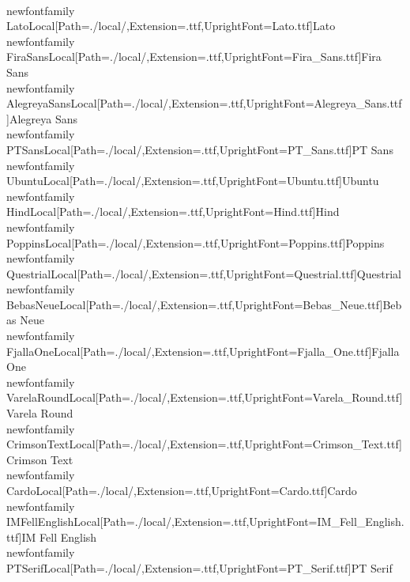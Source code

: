 \\newfontfamily\\LatoLocal[Path=./local/,Extension=.ttf,UprightFont={Lato.ttf}]{Lato}
\\newfontfamily\\FiraSansLocal[Path=./local/,Extension=.ttf,UprightFont={Fira_Sans.ttf}]{Fira Sans}
\\newfontfamily\\AlegreyaSansLocal[Path=./local/,Extension=.ttf,UprightFont={Alegreya_Sans.ttf}]{Alegreya Sans}
\\newfontfamily\\PTSansLocal[Path=./local/,Extension=.ttf,UprightFont={PT_Sans.ttf}]{PT Sans}
\\newfontfamily\\UbuntuLocal[Path=./local/,Extension=.ttf,UprightFont={Ubuntu.ttf}]{Ubuntu}
\\newfontfamily\\HindLocal[Path=./local/,Extension=.ttf,UprightFont={Hind.ttf}]{Hind}
\\newfontfamily\\PoppinsLocal[Path=./local/,Extension=.ttf,UprightFont={Poppins.ttf}]{Poppins}
\\newfontfamily\\QuestrialLocal[Path=./local/,Extension=.ttf,UprightFont={Questrial.ttf}]{Questrial}
\\newfontfamily\\BebasNeueLocal[Path=./local/,Extension=.ttf,UprightFont={Bebas_Neue.ttf}]{Bebas Neue}
\\newfontfamily\\FjallaOneLocal[Path=./local/,Extension=.ttf,UprightFont={Fjalla_One.ttf}]{Fjalla One}
\\newfontfamily\\VarelaRoundLocal[Path=./local/,Extension=.ttf,UprightFont={Varela_Round.ttf}]{Varela Round}
\\newfontfamily\\CrimsonTextLocal[Path=./local/,Extension=.ttf,UprightFont={Crimson_Text.ttf}]{Crimson Text}
\\newfontfamily\\CardoLocal[Path=./local/,Extension=.ttf,UprightFont={Cardo.ttf}]{Cardo}
\\newfontfamily\\IMFellEnglishLocal[Path=./local/,Extension=.ttf,UprightFont={IM_Fell_English.ttf}]{IM Fell English}
\\newfontfamily\\PTSerifLocal[Path=./local/,Extension=.ttf,UprightFont={PT_Serif.ttf}]{PT Serif}

